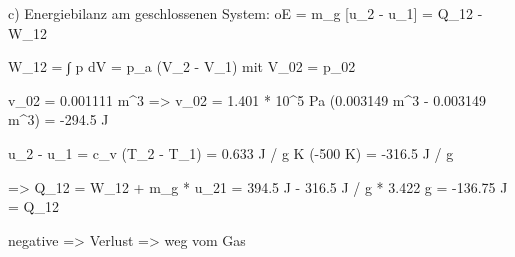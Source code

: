 c) Energiebilanz am geschlossenen System: oE = m_g [u_2 - u_1] = Q_12 - W_12

W_12 = ∫ p dV = p_a (V_2 - V_1) mit V_02 = p_02

v_02 = 0.001111 m^3 => v_02 = 1.401 * 10^5 Pa (0.003149 m^3 - 0.003149 m^3) = -294.5 J

u_2 - u_1 = c_v (T_2 - T_1) = 0.633 J / g K (-500 K) = -316.5 J / g

=> Q_12 = W_12 + m_g * u_21 = 394.5 J - 316.5 J / g * 3.422 g = -136.75 J = Q_12

negative => Verlust => weg vom Gas